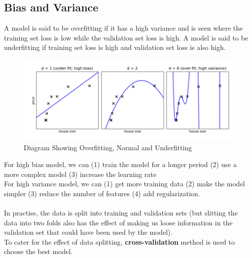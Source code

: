 \documentclass[12pt,a4paper,titlepage,portrait,openany]{book}
\begin{document}
	\subsection{Bias and Variance}
	A model is said to be overfitting  if it has a high variance and is seen where the training set loss is low while the validation set loss is high. A model is said to be underfitting if training set loss is high and validation set loss is also high.
	
	\begin{figure}
		\centering
		\includegraphics[width=\linewidth, height=0.26\textheight]{bias_variance}
		\caption[]{Diagram Showing Overfitting, Normal and Underfitting\protect\footnotemark}
		\label{fig:biasvariance}
	\end{figure}

	
	For high bias model, we can (1) train the model for a longer period (2) use a more complex model (3) increase the learning rate\\
	For high variance model, we can (1) get more training data (2) make the model simpler (3) reduce the number of features (4) add regularization. \\\\
	In practise, the data is split into training and validation sets (but slitting the data into two folds also has the effect of making us loose information in the validation set that could have been used by the model). \\
	
	To cater for the effect of data splitting, \textbf{cross-validation} method is used to choose the best model.
	
\end{document}
